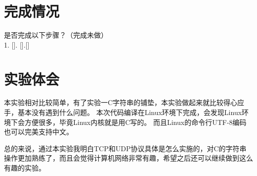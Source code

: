 \documentclass[logo,reportComp]{thesis}
\begin{document}
\section{完成情况}
是否完成以下步骤？（\cmark 完成\quad\xmark 未做）\\
1. [\cmark]. [\cmark].[\cmark]

\section{实验体会}
本实验相对比较简单，有了实验一C字符串的铺垫，本实验做起来就比较得心应手，基本没有遇到什么问题。
本次代码编译在Linux环境下完成，会发现Linux环境下会方便很多，毕竟Linux内核就是用C写的。
而且Linux的命令行UTF-8编码也可以完美支持中文。

总的来说，通过本实验我明白TCP和UDP协议具体是怎么实施的，对C的字符串操作更加熟练了，而且会觉得计算机网络非常有趣，希望之后还可以继续做到这么有趣的实验。
\end{document}

